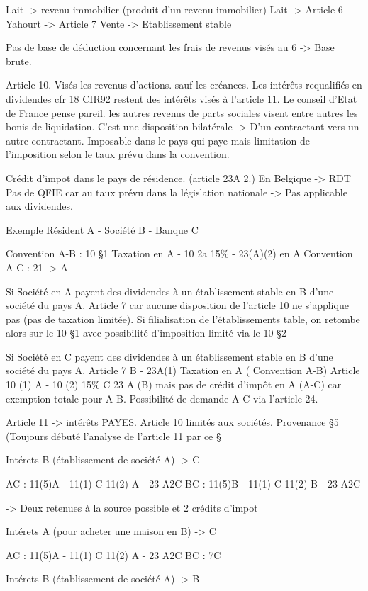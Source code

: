 \documentclass{book}
\begin{document}
Lait -> revenu immobilier (produit d'un revenu immobilier)
Lait -> Article 6
Yahourt -> Article 7
Vente -> Etablissement stable

Pas de base de déduction concernant les frais de revenus visés au 6 -> Base brute.


Article 10. Visés les revenus d'actions. sauf les créances. Les intérêts requalifiés en dividendes cfr 18 CIR92 restent des intérêts visés à l'article 11. Le conseil d'Etat de France pense pareil. les autres revenus de parts sociales visent entre autres les bonis de liquidation. C'est une disposition bilatérale -> D'un contractant vers un autre contractant. Imposable dans le pays qui paye mais limitation de l'imposition selon le taux prévu dans la convention.

Crédit d'impot dans le pays de résidence. (article 23A 2.) En Belgique -> RDT
Pas de QFIE car au taux prévu dans la législation nationale -> Pas applicable aux dividendes.

Exemple Résident A - Société B - Banque C

Convention A-B : 10 §1 Taxation en A - 10 2a 15\% - 23(A)(2) en A
Convention A-C : 21 -> A


Si Société en A payent des dividendes à un établissement stable en B d'une société du pays A.
Article 7 car aucune disposition de l'article 10 ne s'applique pas (pas de taxation limitée). Si filialisation de l'établissements table, on retombe alors sur le 10 §1 avec possibilité d'imposition limité via le 10 §2

Si Société en C payent des dividendes à un établissement stable en B d'une société du pays A.
Article 7 B - 23A(1) Taxation en A ( Convention A-B)
Article 10 (1) A - 10 (2) 15\% C 23 A (B) mais pas de crédit d'impôt en A (A-C) car exemption totale pour A-B. Possibilité de demande A-C via l'article 24.

Article 11 -> intérêts PAYES. Article 10 limités aux sociétés.
Provenance §5 (Toujours débuté l'analyse de l'article 11 par ce §

Intérets B (établissement de société A) -> C

AC : 11(5)A - 11(1) C 11(2) A - 23 A2C
BC : 11(5)B - 11(1) C 11(2) B - 23 A2C

-> Deux retenues à la source possible et 2 crédits d'impot

Intérets A (pour acheter une maison en B) -> C

AC : 11(5)A - 11(1) C 11(2) A - 23 A2C
BC : 7C


Intérets B (établissement de société A) -> B
\end{document}
